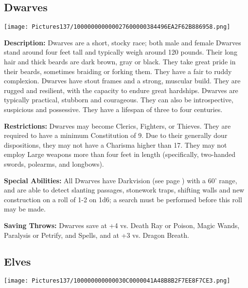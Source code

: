 \documentclass[a4paper,twoside,openany,10pt]{book}
\begin{document}
\begin{multicols}{2}
	

\subsection{Dwarves}\label{dwarves}

\begin{center}
	\texttt{[image: Pictures137/100000000000027600000384496EA2F62B886958.png]}
\end{center}

\textbf{Description: } Dwarves are a short, stocky race; both male and female Dwarves stand around four feet tall and typically weigh around 120 pounds. Their long hair and thick beards are dark brown, gray or black. They take great pride in their beards, sometimes braiding or forking them. They have a fair to ruddy complexion. Dwarves have stout frames and a strong, muscular build. They are rugged and resilient, with the capacity to endure great hardships. Dwarves are typically practical, stubborn and courageous. They can also be introspective, suspicious and possessive. They have a lifespan of three to four centuries.

\textbf{Restrictions: } Dwarves may become Clerics, Fighters, or Thieves. They are required to have a minimum Constitution of 9. Due to their generally dour dispositions, they may not have a Charisma higher than 17. They may not employ Large weapons more than four feet in length (specifically, two-handed swords, polearms, and longbows).

\textbf{Special Abilities:} All Dwarves have Darkvision (see page \hyperlink{darkvision}{\pageref{darkvision}}) with a 60'{} range, and are able to detect slanting passages, stonework traps, shifting walls and new construction on a roll of 1-2 on 1d6; a search must be performed before this roll may be made.

\textbf{Saving Throws: } Dwarves save at +4 vs. Death Ray or Poison, Magic Wands, Paralysis or Petrify, and Spells, and at +3 vs. Dragon Breath.

\columnbreak

\subsection{Elves}\label{elves}

\begin{center}
	\texttt{[image: Pictures137/100000000000030C0000041A48B8B2F7EE8F7CE3.png]}
\end{center}


\end{multicols}
\end{document}
